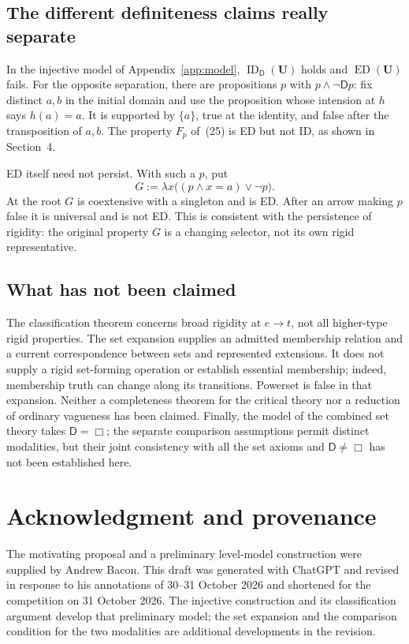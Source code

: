 \documentclass[11pt]{article}
\theoremstyle{definition}
\newcommand{\D}{\mathsf D}
\newcommand{\ED}{\operatorname{ED}}
\newcommand{\ID}{\operatorname{ID}}
\newcommand{\U}{\mathbf U}
\numberwithin{equation}{section}
\begin{document}
\subsection{The different definiteness claims really separate}

In the injective model of Appendix~\ref{app:model}, $\ID_\D (\U)$ holds and $\ED(\U)$ fails. For the opposite separation, there are propositions $p$ with $p\wedge\neg\D p$: fix distinct $a,b$ in the initial domain and use the proposition whose intension at $h$ says $h(a)=a$. It is supported by $\{a\}$, true at the identity, and false after the transposition of $a,b$. The property $F_p$ of~\textup{(25)} is ED but not ID, as shown in Section~4.

ED itself need not persist. With such a $p$, put
$$
G:=\lambda x\bigl((p\wedge x=a)\vee\neg p\bigr).
$$
At the root $G$ is coextensive with a singleton and is ED. After an arrow making $p$ false it is universal and is not ED. This is consistent with the persistence of rigidity: the original property $G$ is a changing selector, not its own rigid representative.

\subsection{What has not been claimed}

The classification theorem concerns broad rigidity at $e\to t$, not all higher-type rigid properties. The set expansion supplies an admitted membership relation and a current correspondence between sets and represented extensions. It does not supply a rigid set-forming operation or establish essential membership; indeed, membership truth can change along its transitions. Powerset is false in that expansion. Neither a completeness theorem for the critical theory nor a reduction of ordinary vagueness has been claimed. Finally, the model of the combined set theory takes $\D =\Box$; the separate comparison assumptions permit distinct modalities, but their joint consistency with all the set axioms and $\D \ne\Box$ has not been established here.


\section*{Acknowledgment and provenance}
The motivating proposal and a preliminary level-model construction were supplied by Andrew Bacon. This draft was generated with ChatGPT and revised in response to his annotations of 30--31 October 2026 and shortened for the competition on 31 October 2026. The injective construction and its classification argument develop that preliminary model; the set expansion and the comparison condition for the two modalities are additional developments in the revision.
\end{document}
